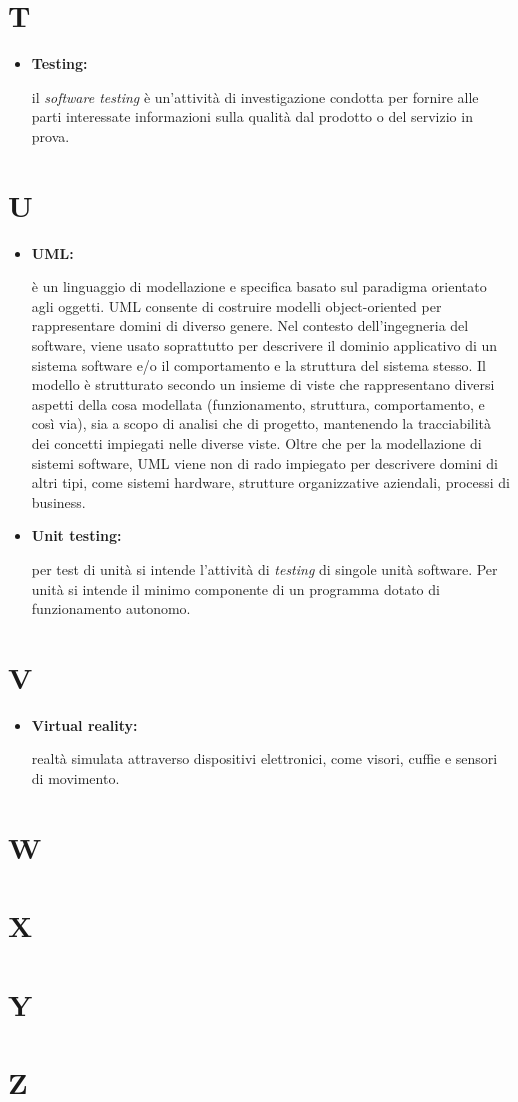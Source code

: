\section*{T}

\begin{itemize}
	\item \hypertarget{test}{\textbf{Testing:}} il \textit{software testing} è un'attività di investigazione condotta per fornire alle parti interessate informazioni sulla qualità dal prodotto o del servizio in prova.
\end{itemize}

\section*{U}

\begin{itemize}
	\item \hypertarget{uml}{\textbf{UML:}} è un linguaggio di modellazione e specifica basato sul paradigma orientato agli oggetti. UML consente di costruire modelli object-oriented per rappresentare domini di diverso genere. Nel contesto dell'ingegneria del software, viene usato soprattutto per descrivere il dominio applicativo di un sistema software e/o il comportamento e la struttura del sistema stesso. Il modello è strutturato secondo un insieme di viste che rappresentano diversi aspetti della cosa modellata (funzionamento, struttura, comportamento, e così via), sia a scopo di analisi che di progetto, mantenendo la tracciabilità dei concetti impiegati nelle diverse viste. Oltre che per la modellazione di sistemi software, UML viene non di rado impiegato per descrivere domini di altri tipi, come sistemi hardware, strutture organizzative aziendali, processi di business.
	\item \hypertarget{ut}{\textbf{Unit testing:}} per test di unità si intende l'attività di \textit{testing} di singole unità software. Per unità si intende il minimo componente di un programma dotato di funzionamento autonomo. 
\end{itemize}

\section*{V}

\begin{itemize}
	\item \hypertarget{vr}{\textbf{Virtual reality:}} realtà simulata attraverso dispositivi elettronici, come visori, cuffie e sensori di movimento.
\end{itemize}

\section*{W}

\section*{X}

\section*{Y}

\section*{Z}